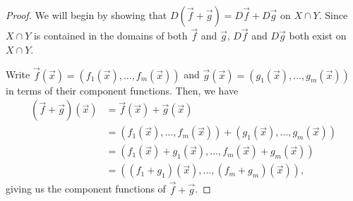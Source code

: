 \documentclass{ximera}
\begin{document}
\begin{proof}
We will begin by showing that $D(\vec{f}+\vec{g}) = D\vec{f}+D\vec{g}$ on $X\cap Y$. Since $X\cap Y$ is contained in the domains of both $\vec{f}$ and $\vec{g}$, $D\vec{f}$ and $D\vec{g}$ both exist on $X\cap Y$.

Write $\vec{f}(\vec{x}) = (f_1(\vec{x}),...,f_m(\vec{x}))$ and $\vec{g}(\vec{x}) = (g_1(\vec{x}),...,g_m(\vec{x}))$ in terms of their component functions. Then, we have
\begin{align*}
(\vec{f}+\vec{g})(\vec{x}) &= \vec{f}(\vec{x})+\vec{g}(\vec{x})\\
&= (f_1(\vec{x}),...,f_m(\vec{x})) + (g_1(\vec{x}),...,g_m(\vec{x}))\\
&= (f_1(\vec{x})+g_1(\vec{x}),...,f_m(\vec{x})+g_m(\vec{x}))\\
&= ((f_1+g_1)(\vec{x}),...,(f_m+g_m)(\vec{x})),
\end{align*}
giving us the component functions of $\vec{f}+\vec{g}$.


\end{proof}
\end{document}
